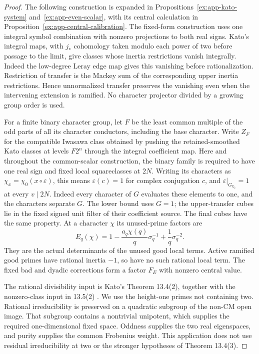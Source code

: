 \documentclass[11pt]{article}
\theoremstyle{definition}
\theoremstyle{remark}
\newcommand{\Q}{\mathbb Q}
\begin{document}
\begin{proof}\leavevmode
The following construction is expanded in
Propositions~\ref{ex:app-kato-system} and~\ref{ex:app-even-scalar},
with its central calculation in Proposition~\ref{ex:app-central-calibration}.
The fixed-form construction uses one integral symbol combination with
nonzero projections to both real signs. Kato's integral maps, with
$j_*$ cohomology taken modulo each power of two before passage to the
limit, give classes whose inertia restrictions vanish integrally.
Indeed the low-degree Leray edge map gives this vanishing before
rationalization. Restriction of transfer is the Mackey sum of the
corresponding upper inertia restrictions. Hence unnormalized transfer
preserves the vanishing even when the intervening extension is ramified.
No character projector divided by a growing group order is used.

For a finite binary character group, let $F$ be the least common
multiple of the odd parts of all its character conductors, including
the base character. Write $Z_F$ for the compatible Iwasawa class
obtained by pushing the retained-smoothed Kato classes at levels
$F2^n$ through the integral coefficient map.
Here and throughout the common-scalar construction, the binary family
is required to have one real sign and fixed local squareclasses at
$2N$. Writing its characters as
$\chi_x=\chi_0(x\circ\varepsilon)$, this means
$\varepsilon(c)=1$ for complex conjugation $c$, and
$\varepsilon|_{G_{\Q_v}}=1$ at every $v\mid2N$.
Indeed every character of $G$ evaluates these elements to one, and
the characters separate $G$. The lower bound uses $G=1$; the
upper-transfer cubes lie in the fixed signed unit filter of their
coefficient source. The final cubes have the same property.
At a character $\chi$ its unused-prime factors are
\[
 E_q(\chi)=1-\frac{a_q\chi(q)}q\sigma_q^{-1}
                 +\frac1q\sigma_q^{-2}.                           \tag{3.1}
\]
They are the actual determinants of the unused good local terms.
Active ramified good primes have rational inertia $-1$, so have no such
rational local term. The fixed bad and dyadic corrections form a factor
$F_E$ with nonzero central value.

The rational divisibility input is Kato's Theorem 13.4(2),
together with the nonzero-class input in 13.5(2)
\cite{kato}. We use the height-one primes not containing two.
Rational irreducibility is preserved on a quadratic subgroup of the
non-CM open image. That subgroup contains a nontrivial unipotent,
which supplies the required one-dimensional fixed space. Oddness
supplies the two real eigenspaces, and purity supplies the common
Frobenius weight. This application does not use residual irreducibility
at two or the stronger hypotheses of Theorem 13.4(3).


\end{proof}
\end{document}
